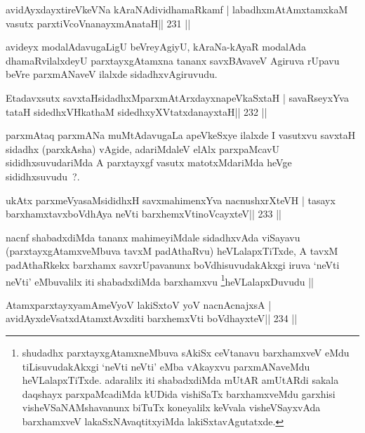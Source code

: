 \begin{shl}
avidAyxdayxtireVkeVNa kAraNAdividhamaRkamf |
labadhxmAtAmxtamxkaM vasutx parxtiVcoV\s nanayxmAnataH\hfill || 231 ||
\end{shl}

\begin{artha}
avideyx modalAdavugaLigU beVreyAgiyU, kAraNa-kAyaR modalAda dhamaRvilalxdeyU parxtayxgAtamxna tananx savxBAvaveV Agiruva rUpavu beVre parxmANaveV ilalxde sidadhxvAgiruvudu.
\end{artha}
\begin{shl}
Etadavxsutx savxtaHsidadhxM\footnotemark[1] parxmAtArxdayxnapeVkaSxtaH |
savaRseyxYva tataH sidedhxVH\footnotemark[1] kathaM sidedhxyXVtatxdanayxtaH\hfill || 232 ||
\end{shl}

\begin{artha}
parxmAtaq parxmANa muMtAdavugaLa apeVkeSxye ilalxde I vasutxvu savxtaH sidadhx (parxkAsha) vAgide, adariMdaleV elAlx parxpaMcavU sididhxsuvudariMda A parxtayxgf vasutx matotxMdariMda heVge sididhxsuvudu~?.
\end{artha}

\begin{shl}
ukAtx parxmeVyasaMsididhxH savxmahimenxYva nacnushxrXteVH |
tasayx barxhamxtavxboVdhAya neVti barxhemxVtinoVcayxteV\hfill || 233 ||
\end{shl}

\begin{artha}
nacnf shabadxdiMda tananx mahimeyiMdale sidadhxvAda viSayavu
(parxtayxgAtamxveMbuva tavxM padAthaRvu) heVLalapxTiTxde, A
tavxM padAthaRkekx barxhamx savxrUpavanunx boVdhisuvudakAkxgi iruva
`neVti neVti' eMbuvalilx iti shabadxdiMda
barxhamxvu \footnote{shudadhx parxtayxgAtamxneMbuva sAkiSx
  ceVtanavu barxhamxveV eMdu tiLisuvudakAkxgi `neVti neVti' eMba
  vAkayxvu parxmANaveMdu heVLalapxTiTxde. adaralilx iti shabadxdiMda
  mUtAR amUtARdi sakala daqshayx parxpaMcadiMda kUDida vishiSaTx
  barxhamxveMdu garxhisi visheVSaNAMshavanunx biTuTx koneyalilx
  keVvala visheVSayxvAda barxhamxveV lakaSxNAvaqtitxyiMda lakiSxtavAgutatxde.}heVLalapxDuvudu ||
\end{artha}

\begin{shl}
AtamxparxtayxyamAmeVyoV lakiSxtoV yoV nacnA\s cnajxsA |
avidAyxdeVsatxdAtamxtAvxditi barxhemxVti boVdhayxteV\hfill || 234 ||
\end{shl}

